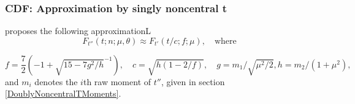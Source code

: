 \subsubsection{CDF: Approximation by singly noncentral t}
\cite{Broda_2007} proposes the following approximationL
\begin{equation}  
	F_{t''}(t;n;\mu,\theta) \approx F_{t'}(t/c;f;\mu), \quad \text{where}
\end{equation}

\begin{equation}  
	f=\frac{7}{2} \left(-1+\sqrt{15-7g^2/h}^{-1}\right), \quad c=\sqrt{h(1-2/f)}, \quad g=m_1/\sqrt{\mu^2/2}, h=m_2/(1+\mu^2),
\end{equation}
and $m_i$ denotes the $i$th raw moment of $t''$, given in section \ref{DoublyNoncentralTMoments}.





